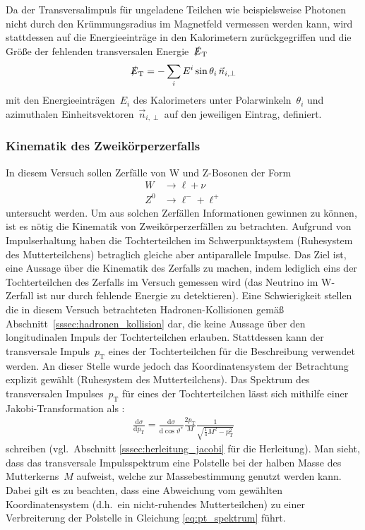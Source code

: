 \documentclass[11pt, a4paper]{article}
\numberwithin{equation}{section}
\begin{document}
Da der Transversalimpuls für ungeladene Teilchen wie beispielsweise Photonen nicht durch den Krümmungsradius im Magnetfeld vermessen werden kann, wird stattdessen auf die Energieeinträge in den Kalorimetern zurückgegriffen und die Größe der fehlenden transversalen Energie~$\slashed{E}_\mathrm{T}$
\begin{align*}
	\slashed{E}_\mathrm{T} = - \sum_{i} E^i \sin\theta_i \, \vec{n}_{i,\perp}
\end{align*}
mit den Energieeinträgen~$E_i$ des Kalorimeters unter Polarwinkeln~$\theta_i$  und azimuthalen Einheitsvektoren~$\vec{n}_{i,\perp}$ auf den jeweiligen Eintrag, definiert.

\subsubsection{Kinematik des Zweikörperzerfalls}
\label{sssec:kinamtik_zweikoerperzerfall}
In diesem Versuch sollen Zerfälle von W und Z-Bosonen der Form 
\begin{align*}
	W &\rightarrow \ell + \nu \\
	Z^0 &\rightarrow \ell^- + \ell^+
\end{align*}
untersucht werden.
Um aus solchen Zerfällen Informationen gewinnen zu können, ist es nötig die Kinematik von Zweikörperzerfällen zu betrachten.
Aufgrund von Impulserhaltung haben die Tochterteilchen im Schwerpunktsystem (Ruhesystem des Mutterteilchens) betraglich gleiche aber antiparallele Impulse.
Das Ziel ist, eine Aussage über die Kinematik des Zerfalls zu machen, indem lediglich eins der Tochterteilchen des Zerfalls im Versuch gemessen wird (das Neutrino im W-Zerfall ist nur durch fehlende Energie zu detektieren).
Eine Schwierigkeit stellen die in diesem Versuch betrachteten Hadronen-Kollisionen gemäß Abschnitt~\ref{sssec:hadronen_kollision} dar, die keine Aussage über den longitudinalen Impuls der Tochterteilchen erlauben.
Stattdessen kann der transversale Impuls~$p_\mathrm{T}$ eines der Tochterteilchen für die Beschreibung verwendet werden.
An dieser Stelle wurde jedoch das Koordinatensystem der Betrachtung explizit gewählt (Ruhesystem des Mutterteilchens).
Das Spektrum des transversalen Impulses~$p_\mathrm{T}$ für eines der Tochterteilchen lässt sich mithilfe einer Jakobi-Transformation als \cite{script}:
\begin{align}
	\label{eq:pt_spektrum}
	\frac{\mathrm{d} \sigma}{\mathrm{d}p_\mathrm{T}} = \frac{\mathrm{d}\sigma}{\mathrm{d}\cos\vartheta^*} \frac{2 p_\mathrm{T}}{M} \frac{1}{\sqrt{\frac{1}{4} M^2 - p_\mathrm{T}^2}}
\end{align}
schreiben (vgl.\ Abschnitt \ref{sssec:herleitung_jacobi} für die Herleitung).
Man sieht, dass das transversale Impulsspektrum eine Polstelle bei der halben Masse des Mutterkerns~$M$ aufweist, welche zur Massebestimmung genutzt werden kann.
Dabei gilt es zu beachten, dass eine Abweichung vom gewählten Koordinatensystem (d.h.\ ein nicht-ruhendes Mutterteilchen) zu einer Verbreiterung der Polstelle in Gleichung \eqref{eq:pt_spektrum} führt.
\end{document}
